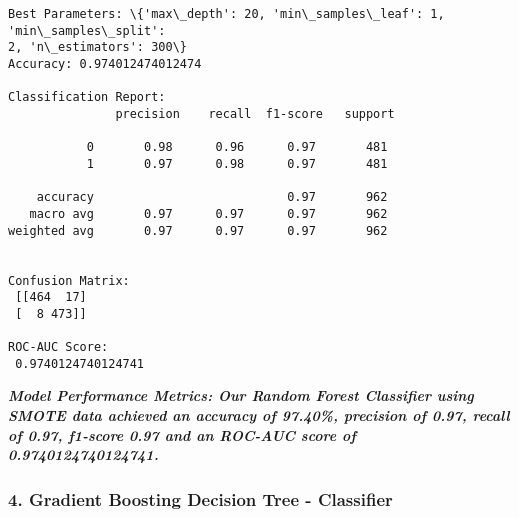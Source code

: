 \documentclass[11pt]{article}
\begin{document}
    \begin{Verbatim}[commandchars=\\\{\}]
Best Parameters: \{'max\_depth': 20, 'min\_samples\_leaf': 1, 'min\_samples\_split':
2, 'n\_estimators': 300\}
Accuracy: 0.974012474012474

Classification Report:
               precision    recall  f1-score   support

           0       0.98      0.96      0.97       481
           1       0.97      0.98      0.97       481

    accuracy                           0.97       962
   macro avg       0.97      0.97      0.97       962
weighted avg       0.97      0.97      0.97       962


Confusion Matrix:
 [[464  17]
 [  8 473]]

ROC-AUC Score:
 0.9740124740124741
    \end{Verbatim}

    \textbf{\emph{Model Performance Metrics: Our Random Forest Classifier
using SMOTE data achieved an accuracy of 97.40\%, precision of 0.97,
recall of 0.97, f1-score 0.97 and an ROC-AUC score of
0.9740124740124741.}}

    \subsubsection{4. Gradient Boosting Decision Tree -
Classifier}\label{gradient-boosting-decision-tree---classifier}
\end{document}
